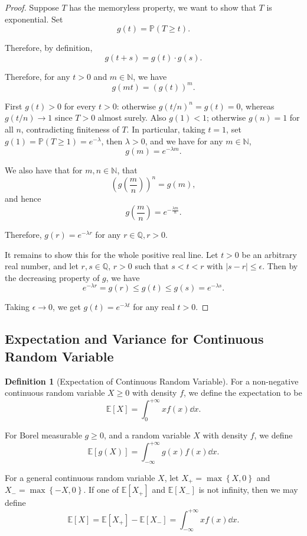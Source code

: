 \documentclass[11pt]{article}
\numberwithin{equation}{section}
\theoremstyle{definition}
\newtheorem{definition}[theorem]{Definition}
\theoremstyle{remark}
\newcommand{\pqty}[1]{\left(#1\right)}
\newcommand{\bqty}[1]{\left[#1\right]}
\newcommand{\Bqty}[1]{\left\{#1\right\}}
\newcommand{\abs}[1]{\left|#1\right|}
\newcommand{\NN}{\mathbb N}
\newcommand{\QQ}{\mathbb Q}
\newcommand{\plusinfty}{+\infty}
\newcommand{\minusinfty}{-\infty}
\newcommand{\Prob}{\mathbb P}
\newcommand{\Expt}{\mathbb E}
\begin{document}
\begin{proof}\label{probability-proof-058}
    Suppose \(T\) has the memoryless property, we want to show that \(T\) is exponential. Set
    \[
        g\pqty{t} = \Prob\pqty{T \geq t}.
    \]

    Therefore, by definition,
    \[
        g\pqty{t + s} = g\pqty{t} \cdot g\pqty{s}.
    \]

    Therefore, for any \(t > 0\) and \(m \in \NN\), we have
    \[
        g\pqty{mt} = \pqty{g\pqty{t}}^m.
    \]

    First \(g(t)>0\) for every \(t>0\): otherwise \(g(t/n)^n=g(t)=0\), whereas \(g(t/n)\to1\) since \(T>0\) almost surely. Also \(g(1)<1\); otherwise \(g(n)=1\) for all \(n\), contradicting finiteness of \(T\). In particular, taking \(t = 1\), set \(g\pqty{1} = \Prob\pqty{T \geq 1} = e^{-\lambda}\), then \(\lambda > 0\), and we have for any \(m \in \NN\),
    \[
        g\pqty{m} = e^{-\lambda m}.
    \]

    We also have that for \(m, n \in \NN\), that
    \[
        \pqty{g\pqty{\frac{m}{n}}}^{n} = g\pqty{m},
    \]
    and hence
    \[
        g\pqty{\frac{m}{n}} = e^{- \frac{\lambda m}{n}}.
    \]

    Therefore, \(g\pqty{r} = e^{-\lambda r}\) for any \(r \in \QQ, r > 0\).

    It remains to show this for the whole positive real line. Let \(t > 0\) be an arbitrary real number, and let \(r, s \in \QQ\), \(r > 0\) such that \(s < t < r\) with \(\abs{s - r} \leq \epsilon\). Then by the decreasing property of \(g\), we have
    \[
        e^{-\lambda r} = g\pqty{r} \leq g\pqty{t} \leq g\pqty{s} = e^{-\lambda s}.
    \]

    Taking \(\epsilon \to 0\), we get \(g\pqty{t} = e^{-\lambda t}\) for any real \(t > 0\).
\end{proof}

\subsection{Expectation and Variance for Continuous Random Variable}

\begin{definition}[Expectation of Continuous Random Variable]\label{probability-definition-047}
    \label{probability-def:expectation-continuous}%
    For a non-negative continuous random variable \(X \geq 0\) with density \(f\), we define the expectation to be
    \[
        \Expt\bqty{X} = \int_{0}^{\plusinfty} x f\pqty{x} \dd{x}.
    \]

    For Borel measurable \(g \geq 0\), and a random variable \(X\) with density \(f\), we define
    \[
        \Expt\bqty{g\pqty{X}} = \int_{\minusinfty}^{\plusinfty} g\pqty{x} f\pqty{x} \dd{x}.
    \]

    For a general continuous random variable \(X\), let \(X_+ = \max\Bqty{X, 0}\) and \(X_- = \max\Bqty{-X, 0}\). If one of \(\Expt\bqty{X_+}\) and \(\Expt\bqty{X_-}\) is not infinity, then we may define
    \[
        \Expt\bqty{X} = \Expt\bqty{X_+} - \Expt\bqty{X_-} = \int_{\minusinfty}^{\plusinfty} x f\pqty{x} \dd{x}.
    \]  
\end{definition}
\end{document}
